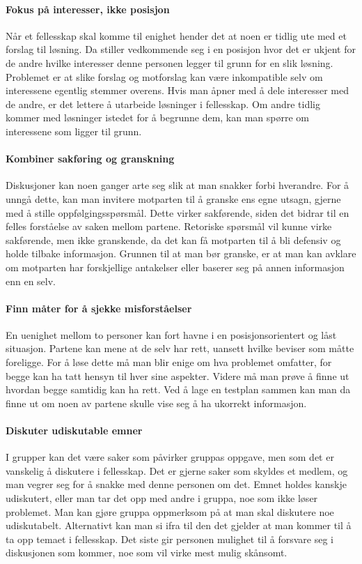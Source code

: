 \paragraph{Fokus på interesser, ikke posisjon}
Når et fellesskap skal komme til enighet hender det at noen er tidlig ute med et forslag til løsning.
Da stiller vedkommende seg i en posisjon hvor det er ukjent for de andre hvilke interesser denne personen legger til grunn for en slik løsning.
Problemet er at slike forslag og motforslag kan være inkompatible selv om interessene egentlig stemmer overens.
Hvis man åpner med å dele interesser med de andre, er det lettere å utarbeide løsninger i fellesskap.
Om andre tidlig kommer med løsninger istedet for å begrunne dem, kan man spørre om interessene som ligger til grunn.

\paragraph{Kombiner sakføring og granskning}
Diskusjoner kan noen ganger arte seg slik at man snakker forbi hverandre.
For å unngå dette, kan man invitere motparten til å granske ens egne utsagn, gjerne med å stille oppfølgingsspørsmål.
Dette virker sakførende, siden det bidrar til en felles forståelse av saken mellom partene.
Retoriske spørsmål vil kunne virke sakførende, men ikke granskende, da det kan få motparten til å bli defensiv og holde tilbake informasjon.
Grunnen til at man bør granske, er at man kan avklare om motparten har forskjellige antakelser eller baserer seg på annen informasjon enn en selv.

\paragraph{Finn måter for å sjekke misforståelser}
En uenighet mellom to personer kan fort havne i en posisjonsorientert og låst situasjon.
Partene kan mene at de selv har rett, uansett hvilke beviser som måtte foreligge.
For å løse dette må man blir enige om hva problemet omfatter, for begge kan ha tatt hensyn til hver sine aspekter.
Videre må man prøve å finne ut hvordan begge samtidig kan ha rett.
Ved å lage en testplan sammen kan man da finne ut om noen av partene skulle vise seg å ha ukorrekt informasjon.

\paragraph{Diskuter udiskutable emner}
I grupper kan det være saker som påvirker gruppas oppgave, men som det er vanskelig å diskutere i fellesskap.
Det er gjerne saker som skyldes et medlem, og man vegrer seg for å snakke med denne personen om det.
Emnet holdes kanskje udiskutert, eller man tar det opp med andre i gruppa, noe som ikke løser problemet.
Man kan gjøre gruppa oppmerksom på at man skal diskutere noe udiskutabelt.
Alternativt kan man si ifra til den det gjelder at man kommer til å ta opp temaet i fellesskap.
Det siste gir personen mulighet til å forsvare seg i diskusjonen som kommer, noe som vil virke mest mulig skånsomt.

